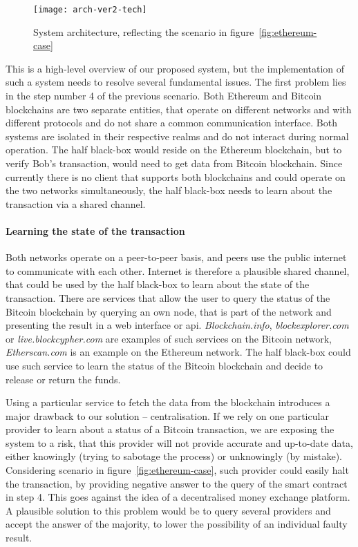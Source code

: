\begin{figure}[ht]
    \centering
    \texttt{[image: arch-ver2-tech]}
    \caption{System architecture, reflecting the scenario in figure~\ref{fig:ethereum-case}}
    \label{fig:arch-ver2-tech}
\end{figure}

This is a high-level overview of our proposed system, but the implementation of such a system needs to resolve several fundamental issues. The first problem lies in the step number 4 of the previous scenario. Both Ethereum and Bitcoin blockchains are two separate entities, that operate on different networks and with different protocols and do not share a common communication interface. Both systems are isolated in their respective realms and do not interact during normal operation. The half black-box would reside on the Ethereum blockchain, but to verify Bob’s transaction, would need to get data from Bitcoin blockchain. Since currently there is no client that supports both blockchains and could operate on the two networks simultaneously, the half black-box needs to learn about the transaction via a shared channel.

\paragraph{Learning the state of the transaction}
Both networks operate on a peer-to-peer basis, and peers use the public internet to communicate with each other. Internet is therefore a plausible shared channel, that could be used by the half black-box to learn about the state of the transaction. There are services that allow the user to query the status of the Bitcoin blockchain by querying an own node, that is part of the network and presenting the result in a web interface or \acrshort{api}. \textit{Blockchain.info}, \textit{blockexplorer.com} or \textit{live.blockcypher.com} are examples of such services on the Bitcoin network, \textit{Etherscan.com} is an example on the Ethereum network. The half black-box could use such service to learn the status of the Bitcoin blockchain and decide to release or return the funds.

Using a particular service to fetch the data from the blockchain introduces a major drawback to our solution -- centralisation. If we rely on one particular provider to learn about a status of a Bitcoin transaction, we are exposing the system to a risk, that this provider will not provide accurate and up-to-date data, either knowingly (trying to sabotage the process) or unknowingly (by mistake). Considering scenario in figure~\ref{fig:ethereum-case}, such provider could easily halt the transaction, by providing negative answer to the query of the smart contract in step 4. This goes against the idea of a decentralised money exchange platform. A plausible solution to this problem would be to query several providers and accept the answer of the majority, to lower the possibility of an individual faulty result.

